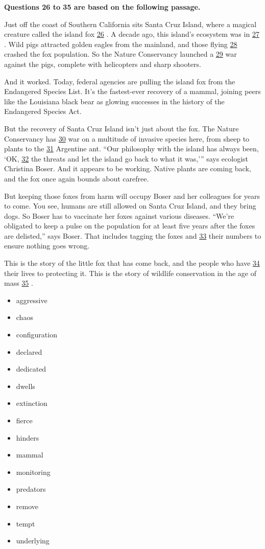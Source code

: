 \documentclass[UTF8,11pt]{ctexart}
\begin{document}
\textbf{Questions 26 to 35 are based on the following passage.}


Just off the coast of Southern California sits Santa Cruz Island, where a magical creature called the island fox \uline{26} . A decade ago, this island’s ecosystem was in \uline{27} . Wild pigs attracted golden eagles from the mainland, and those flying \uline{28} crashed the fox population. So the Nature Conservancy launched a \uline{29} war against the pigs, complete with helicopters and sharp shooters.


And it worked. Today, federal agencies are pulling the island fox from the Endangered Species List. It’s the fastest-ever recovery of a mammal, joining peers like the Louisiana black bear as glowing successes in the history of the Endangered Species Act.


But the recovery of Santa Cruz Island isn’t just about the fox. The Nature Conservancy has \uline{30} war on a multitude of invasive species here, from sheep to plants to the \uline{31} Argentine ant. “Our philosophy with the island has always been, ‘OK, \uline{32} the threats and let the island go back to what it was,’” says ecologist Christina Boser. And it appears to be working. Native plants are coming back, and the fox once again bounds about carefree.


But keeping those foxes from harm will occupy Boser and her colleagues for years to come. You see, humans are still allowed on Santa Cruz Island, and they bring dogs. So Boser has to vaccinate her foxes against various diseases. “We’re obligated to keep a pulse on the population for at least five years after the foxes are delisted,” says Boser. That includes tagging the foxes and \uline{33} their numbers to ensure nothing goes wrong.


This is the story of the little fox that has come back, and the people who have \uline{34} their lives to protecting it. This is the story of wildlife conservation in the age of mass \uline{35} .


\begin{itemize}[leftmargin=2em,itemsep=.2em,topsep=.4em]\item[A.] aggressive
\item[B.] chaos
\item[C.] configuration
\item[D.] declared
\item[E.] dedicated
\item[F.] dwells
\item[G.] extinction
\item[H.] fierce
\item[I.] hinders
\item[J.] mammal
\item[K.] monitoring
\item[L.] predators
\item[M.] remove
\item[N.] tempt
\item[O.] underlying
\end{itemize}
\end{document}
